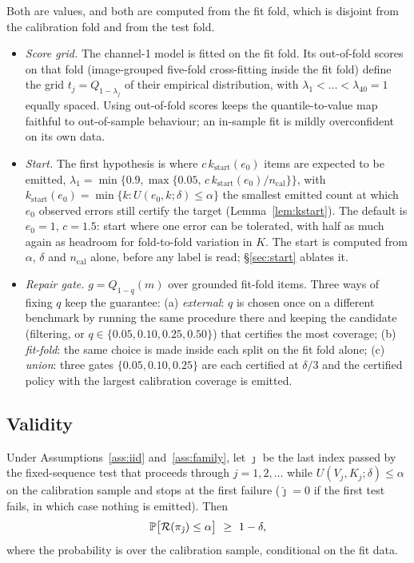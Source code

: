 Both are values, and both are computed from the fit fold, which is disjoint from the calibration
fold and from the test fold.
\begin{itemize}
\item \emph{Score grid.} The channel-1 model is fitted on the fit fold. Its out-of-fold scores on
  that fold (image-grouped five-fold cross-fitting inside the fit fold) define the grid
  $t_j=Q_{1-\lambda_j}$ of their empirical distribution, with $\lambda_1<\dots<\lambda_{40}=1$
  equally spaced. Using out-of-fold scores keeps the quantile-to-value map faithful to
  out-of-sample behaviour; an in-sample fit is mildly overconfident on its own data.
\item \emph{Start.} The first hypothesis is where $c\,k_{\mathrm{start}}(e_0)$ items are expected
  to be emitted, $\lambda_1=\min\{0.9,\max\{0.05,\,c\,k_{\mathrm{start}}(e_0)/n_{\mathrm{cal}}\}\}$,
  with $k_{\mathrm{start}}(e_0)=\min\{k:U(e_0,k;\delta)\le\alpha\}$ the smallest emitted count at
  which $e_0$ observed errors still certify the target (Lemma~\ref{lem:kstart}). The default is
  $e_0=1$, $c=1.5$: start where one error can be tolerated, with half as much again as headroom for
  fold-to-fold variation in $K$. The start is computed from $\alpha$, $\delta$ and $n_{\mathrm{cal}}$
  alone, before any label is read; \S\ref{sec:start} ablates it.
\item \emph{Repair gate.} $g=Q_{1-q}(m)$ over grounded fit-fold items. Three ways of fixing
  $q$ keep the guarantee: (a) \emph{external}: $q$ is chosen once on a different benchmark by
  running the same procedure there and keeping the candidate (filtering, or $q\in\{0.05,0.10,0.25,0.50\}$)
  that certifies the most coverage; (b) \emph{fit-fold}: the same choice is made inside each split on the fit
  fold alone; (c) \emph{union}: three gates $\{0.05,0.10,0.25\}$ are each certified at $\delta/3$ and
  the certified policy with the largest calibration coverage is emitted.
\end{itemize}

\subsection{Validity}
\label{sec:validity}

\begin{theorem}
\label{thm:validity}
Under Assumptions~\ref{ass:iid} and~\ref{ass:family}, let $\hat\jmath$ be the last index passed by the
fixed-sequence test that proceeds through $j=1,2,\dots$ while $U(V_j,K_j;\delta)\le\alpha$ on the
calibration sample and stops at the first failure ($\hat\jmath=0$ if the first test fails, in which
case nothing is emitted). Then
\[
\Pr\bigl[\Risk(\pi_{\hat\jmath})\le\alpha\bigr]\ \ge\ 1-\delta,
\]
where the probability is over the calibration sample, conditional on the fit data.
\end{theorem}

